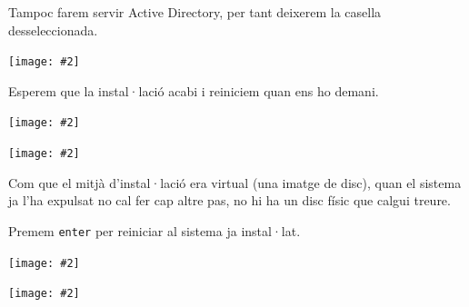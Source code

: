 \documentclass[a4paper,12pt]{article}
\newcommand{\mygraphic}[2][width=0.9\textwidth]{\begin{center}
		\centering\texttt{[image: \#2]}\par
\end{center}}
\begin{document}
Tampoc farem servir Active Directory, per tant deixerem la casella desseleccionada.
\mygraphic[height=0.45\textheight]{imatges/a21.png}

\newpage
Esperem que la instal·lació acabi i reiniciem quan ens ho demani.
\mygraphic[height=0.45\textheight]{imatges/a22.png}
\mygraphic[height=0.45\textheight]{imatges/a23.png}

\newpage
Com que el mitjà d'instal·lació era virtual (una imatge de disc), quan el sistema ja l'ha expulsat no cal fer cap altre pas, no hi ha un disc físic que calgui treure.

Premem \texttt{enter} per reiniciar al sistema ja instal·lat.
\mygraphic[height=0.44\textheight]{imatges/a24.png}
\mygraphic[height=0.44\textheight]{imatges/a25.png}
\end{document}

